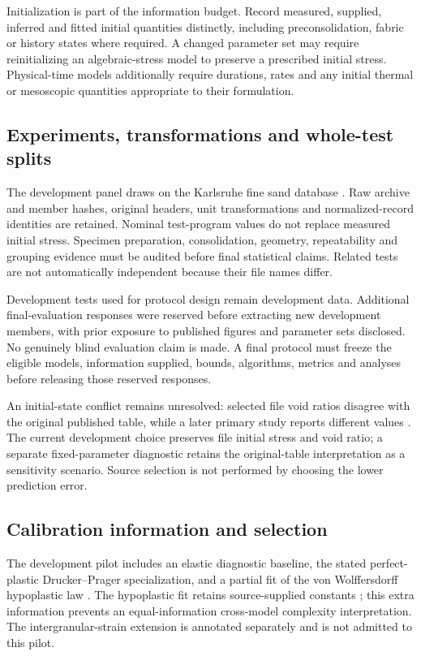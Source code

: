 \documentclass[11pt,a4paper]{article}
\begin{document}
Initialization is part of the information budget. Record measured, supplied, inferred and fitted initial quantities distinctly, including preconsolidation, fabric or history states where required. A changed parameter set may require reinitializing an algebraic-stress model to preserve a prescribed initial stress. Physical-time models additionally require durations, rates and any initial thermal or mesoscopic quantities appropriate to their formulation.

\subsection{Experiments, transformations and whole-test splits}
The development panel draws on the Karlsruhe fine sand database \cite{wt1,wt2}. Raw archive and member hashes, original headers, unit transformations and normalized-record identities are retained. Nominal test-program values do not replace measured initial stress. Specimen preparation, consolidation, geometry, repeatability and grouping evidence must be audited before final statistical claims. Related tests are not automatically independent because their file names differ.

Development tests used for protocol design remain development data. Additional final-evaluation responses were reserved before extracting new development members, with prior exposure to published figures and parameter sets disclosed. No genuinely blind evaluation claim is made. A final protocol must freeze the eligible models, information supplied, bounds, algorithms, metrics and analyses before releasing those reserved responses.

An initial-state conflict remains unresolved: selected file void ratios disagree with the original published table, while a later primary study reports different values \cite{yeh}. The current development choice preserves file initial stress and void ratio; a separate fixed-parameter diagnostic retains the original-table interpretation as a sensitivity scenario. Source selection is not performed by choosing the lower prediction error.

\subsection{Calibration information and selection}
The development pilot includes an elastic diagnostic baseline, the stated perfect-plastic Drucker--Prager specialization, and a partial fit of the von Wolffersdorff hypoplastic law \cite{vw96}. The hypoplastic fit retains source-supplied constants \cite{overshoot}; this extra information prevents an equal-information cross-model complexity interpretation. The intergranular-strain extension \cite{nh97} is annotated separately and is not admitted to this pilot.
\end{document}
